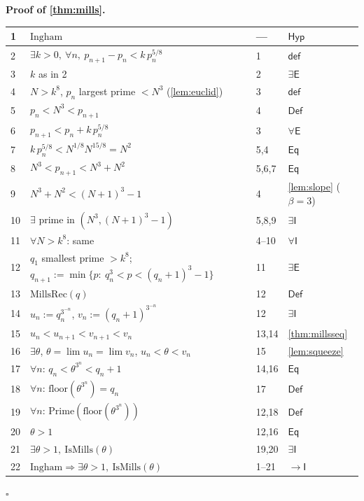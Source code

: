 \documentclass[11pt,reqno]{amsart}
\theoremstyle{blueplain}
\renewcommand{\qedsymbol}{\textcolor{proofqed}{\ensuremath{\square}}}
\renewenvironment{proof}[1][Proof]{\par\noindent\textbf{\textcolor{proofhead}{#1.}}\par\nobreak}{\par\nobreak\hfill\qedsymbol}
\numberwithin{equation}{section}
\begin{document}
\begin{proof}[\textbf{Proof of \cref{thm:mills}}]
	\label{proof:mills}
	{\scriptsize
		\begin{tabular}{|m{0.7cm}|m{12cm}|m{1.4cm}|m{2.5cm}|}
			\hline
			1 & $\text{Ingham}$ & --- & $\mathsf{Hyp}$ \\ \hline
			2 & $\exists k>0,\ \forall n,\ p_{n+1}-p_n<k\,p_n^{5/8}$ & 1 & $\mathsf{def}$ \\ \hline
			3 & $k$ as in 2 & 2 & $\exists\mathsf{E}$ \\ \hline
			4 & $N>k^{8}$, $p_n$ largest prime $<N^{3}$ (\cref{lem:euclid}) & 3 & $\mathsf{def}$ \\ \hline
			5 & $p_n<N^{3}<p_{n+1}$ & 4 & $\mathsf{Def}$ \\ \hline
			6 & $p_{n+1}<p_n+k\,p_n^{5/8}$ & 3 & $\forall\mathsf{E}$ \\ \hline
			7 & $k\,p_n^{5/8}<N^{1/8}N^{15/8}=N^{2}$ & 5,4 & $\mathsf{Eq}$ \\ \hline
			8 & $N^{3}<p_{n+1}<N^{3}+N^{2}$ & 5,6,7 & $\mathsf{Eq}$ \\ \hline
			9 & $N^{3}+N^{2}<(N+1)^{3}-1$ & 4 & \cref{lem:slope} ($\beta=3$) \\ \hline
			10 & $\exists$ prime in $(N^{3},(N+1)^{3}-1)$ & 5,8,9 & $\exists\mathsf{I}$ \\ \hline
			11 & $\forall N>k^{8}$: same & 4--10 & $\forall\mathsf{I}$ \\ \hline
			12 & $q_1$ smallest prime $>k^{8}$; $q_{n+1}:=\min\{p:\ q_n^{3}<p<(q_n+1)^{3}-1\}$ & 11 & $\exists\mathsf{E}$ \\ \hline
			13 & $\mathrm{MillsRec}(q)$ & 12 & $\mathsf{Def}$ \\ \hline
			14 & $u_n:=q_n^{3^{-n}}$, $v_n:=(q_n+1)^{3^{-n}}$ & 12 & $\exists\mathsf{I}$ \\ \hline
			15 & $u_n<u_{n+1}<v_{n+1}<v_n$ & 13,14 & \cref{thm:millsseq} \\ \hline
			16 & $\exists\theta$, $\theta=\lim u_n=\lim v_n$, $u_n<\theta<v_n$ & 15 & \cref{lem:squeeze} \\ \hline
			17 & $\forall n$: $q_n<\theta^{3^{n}}<q_n+1$ & 14,16 & $\mathsf{Eq}$ \\ \hline
			18 & $\forall n$: $\mathrm{floor}(\theta^{3^{n}})=q_n$ & 17 & $\mathsf{Def}$ \\ \hline
			19 & $\forall n$: $\mathrm{Prime}(\mathrm{floor}(\theta^{3^{n}}))$ & 12,18 & $\mathsf{Def}$ \\ \hline
			20 & $\theta>1$ & 12,16 & $\mathsf{Eq}$ \\ \hline
			21 & $\exists\theta>1,\ \mathrm{IsMills}(\theta)$ & 19,20 & $\exists\mathsf{I}$ \\ \hline
			22 & $\text{Ingham}\Rightarrow\exists\theta>1,\ \mathrm{IsMills}(\theta)$ & 1--21 & $\rightarrow\mathsf{I}$ \\ \hline
		\end{tabular}
	}
\end{proof}
\end{document}

